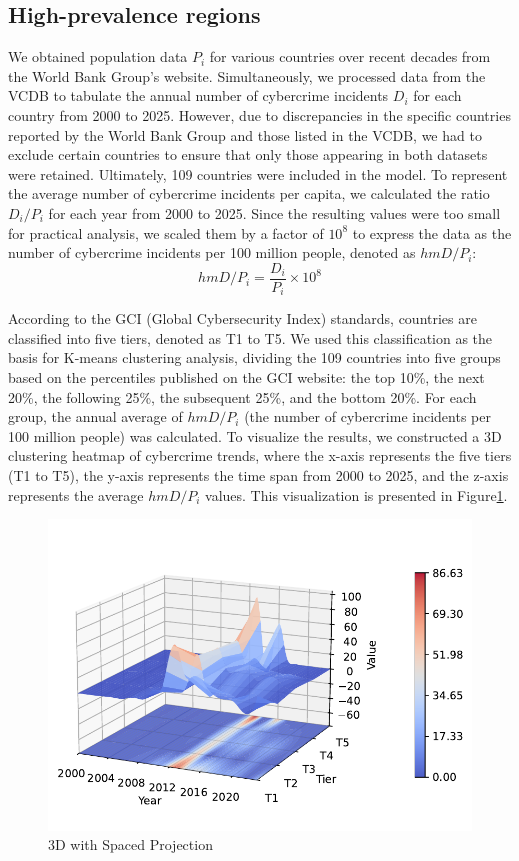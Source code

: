 \subsection{High-prevalence regions}\label{subsec:high-prevalence-regions} %
	We obtained population data $P_i$ for various countries over recent decades from the World Bank Group's website\cite{population}.
	Simultaneously, we processed data from the VCDB to tabulate the annual number of cybercrime incidents $D_i$ for each country from 2000 to 2025.
	However, due to discrepancies in the specific countries reported by the World Bank Group and those listed in the VCDB,
	we had to exclude certain countries to ensure that only those appearing in both datasets were retained.
	Ultimately, 109 countries were included in the model.
	To represent the average number of cybercrime incidents per capita,
	we calculated the ratio $D_i/P_i$ for each year from 2000 to 2025.
	Since the resulting values were too small for practical analysis,
	we scaled them by a factor of $10^{8}$ to express the data as the number of cybercrime incidents per 100 million people,
	denoted as $hmD/P_i$:
	\[ hmD/P_i = \frac{D_i}{P_i} \times 10^{8} \]

	According to the GCI (Global Cybersecurity Index) standards, countries are classified into five tiers, denoted as T1 to T5.
	We used this classification as the basis for K-means clustering analysis,
	dividing the 109 countries into five groups based on the percentiles published on the GCI website:
	the top 10\%, the next 20\%, the following 25\%, the subsequent 25\%, and the bottom 20\%.
	For each group, the annual average of $hmD/P_i$ (the number of cybercrime incidents per 100 million people) was calculated.
	To visualize the results, we constructed a 3D clustering heatmap of cybercrime trends,
	where the x-axis represents the five tiers (T1 to T5),
	the y-axis represents the time span from 2000 to 2025,
	and the z-axis represents the average $hmD/P_i$ values.
	This visualization is presented in Figure\ref{fig:3D_with_Spaced_Projection}.
	\begin{figure}[htbp]
		\centering
		\includegraphics[width=0.8\linewidth]{../rsrc/distributions/3D_with_Spaced_Projection}
		\caption{3D with Spaced Projection}\label{fig:3D_with_Spaced_Projection}
	\end{figure}
